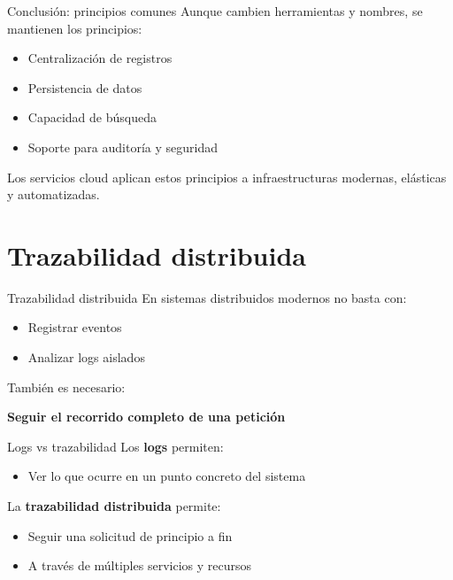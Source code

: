 \documentclass{beamer}
\begin{document}
\begin{frame}{Conclusión: principios comunes}
Aunque cambien herramientas y nombres, se mantienen los principios:
\begin{itemize}
    \item Centralización de registros
    \item Persistencia de datos
    \item Capacidad de búsqueda
    \item Soporte para auditoría y seguridad
\end{itemize}

\vspace{0.3cm}
Los servicios cloud aplican estos principios a infraestructuras modernas, elásticas y automatizadas.
\end{frame}


\section{Trazabilidad distribuida}

\begin{frame}{Trazabilidad distribuida}
En sistemas distribuidos modernos no basta con:
\begin{itemize}
    \item Registrar eventos
    \item Analizar logs aislados
\end{itemize}

\vspace{0.3cm}
También es necesario:
\begin{center}
\textbf{Seguir el recorrido completo de una petición}
\end{center}
\end{frame}

\begin{frame}{Logs vs trazabilidad}
Los \textbf{logs} permiten:
\begin{itemize}
    \item Ver lo que ocurre en un punto concreto del sistema
\end{itemize}

\vspace{0.3cm}
La \textbf{trazabilidad distribuida} permite:
\begin{itemize}
    \item Seguir una solicitud de principio a fin
    \item A través de múltiples servicios y recursos
\end{itemize}
\end{frame}
\end{document}
